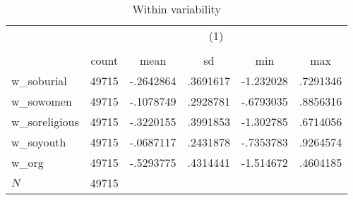 \begin{table}[htbp]\centering
\def\sym#1{\ifmmode^{#1}\else\(^{#1}\)\fi}
\caption{Within variability\label{tab2}}
\begin{tabular}{l*{1}{ccccc}}
\hline\hline
            &\multicolumn{5}{c}{(1)}                                         \\
            &\multicolumn{5}{c}{}                                            \\
            &       count&        mean&          sd&         min&         max\\
\hline
w\_soburial  &       49715&   -.2642864&    .3691617&   -1.232028&    .7291346\\
w\_sowomen   &       49715&   -.1078749&    .2928781&   -.6793035&    .8856316\\
w\_soreligious&       49715&   -.3220155&    .3991853&   -1.302785&    .6714056\\
w\_soyouth   &       49715&   -.0687117&    .2431878&   -.7353783&    .9264574\\
w\_org       &       49715&   -.5293775&    .4314441&   -1.514672&    .4604185\\
\hline
\(N\)       &       49715&            &            &            &            \\
\hline\hline
\end{tabular}
\end{table}
